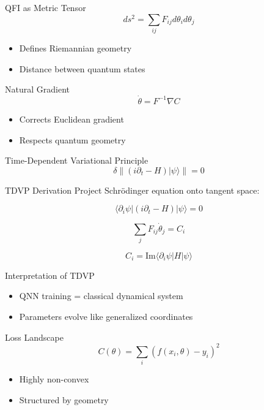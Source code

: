 \documentclass{beamer}
\begin{document}
\begin{frame}{QFI as Metric Tensor}
\[
ds^2 = \sum_{ij} F_{ij} d\theta_i d\theta_j
\]

\begin{itemize}
\item Defines Riemannian geometry
\item Distance between quantum states
\end{itemize}
\end{frame}

\begin{frame}{Natural Gradient}
\[
\dot{\theta} = F^{-1} \nabla C
\]

\begin{itemize}
\item Corrects Euclidean gradient
\item Respects quantum geometry
\end{itemize}
\end{frame}

\begin{frame}{Time-Dependent Variational Principle}
\[
\delta \| (i\partial_t - H)|\psi\rangle \| = 0
\]
\end{frame}

\begin{frame}{TDVP Derivation}
Project Schrödinger equation onto tangent space:

\[
\langle \partial_i\psi | (i\partial_t - H)|\psi\rangle = 0
\]

\[
\sum_j F_{ij}\dot{\theta}_j = C_i
\]

\[
C_i = \mathrm{Im}\langle \partial_i\psi|H|\psi\rangle
\]
\end{frame}

\begin{frame}{Interpretation of TDVP}
\begin{itemize}
\item QNN training = classical dynamical system
\item Parameters evolve like generalized coordinates
\end{itemize}
\end{frame}

\begin{frame}{Loss Landscape}
\[
C(\theta)=\sum_i (f(x_i,\theta)-y_i)^2
\]

\begin{itemize}
\item Highly non-convex
\item Structured by geometry
\end{itemize}
\end{frame}
\end{document}
